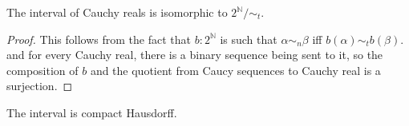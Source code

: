 








\begin{theorem}
  The interval of Cauchy reals is isomorphic to $2^\mathbb N / \sim_t$. 
\end{theorem} 
\begin{proof}
  This follows from the fact that $b:2^\mathbb N$ is such that $\alpha\sim_n \beta$ iff $b(\alpha)\sim_t b(\beta)$. 
  and for every Cauchy real, there is a binary sequence being sent to it, so the composition of $b$ and the 
  quotient from Caucy sequences to Cauchy real is a surjection. 
\end{proof}

\begin{corollary}
  The interval is compact Hausdorff. 
\end{corollary}
